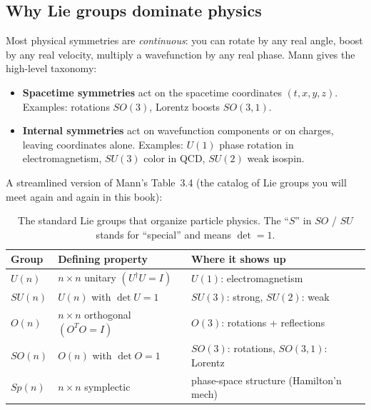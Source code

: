 \documentclass[11pt]{article}
\begin{document}
\subsection*{Why Lie groups dominate physics}

Most physical symmetries are \emph{continuous}: you can rotate by any
real angle, boost by any real velocity, multiply a wavefunction by any
real phase. Mann gives the high-level taxonomy:

\begin{itemize}[leftmargin=1.5em, itemsep=2pt]
  \item \textbf{Spacetime symmetries} act on the spacetime coordinates
    $(t, x, y, z)$. Examples: rotations $SO(3)$, Lorentz boosts $SO(3,1)$.
  \item \textbf{Internal symmetries} act on wavefunction components or
    on charges, leaving coordinates alone. Examples: $U(1)$ phase
    rotation in electromagnetism, $SU(3)$ color in QCD, $SU(2)$ weak
    isospin.
\end{itemize}

A streamlined version of Mann's Table~3.4 (the catalog of Lie groups you
will meet again and again in this book):

\begin{table}[H]
\centering
\renewcommand{\arraystretch}{1.2}
\begin{tabular}{@{}lll@{}}
\toprule
\textbf{Group} & \textbf{Defining property} & \textbf{Where it shows up} \\
\midrule
$U(n)$    & $n\times n$ unitary $(U^\dagger U = I)$
          & $U(1)$: electromagnetism \\
$SU(n)$   & $U(n)$ with $\det U = 1$
          & $SU(3)$: strong, $SU(2)$: weak \\
$O(n)$    & $n\times n$ orthogonal $(O^TO = I)$
          & $O(3)$: rotations + reflections \\
$SO(n)$   & $O(n)$ with $\det O = 1$
          & $SO(3)$: rotations, $SO(3,1)$: Lorentz \\
$Sp(n)$   & $n\times n$ symplectic
          & phase-space structure (Hamilton'n mech) \\
\bottomrule
\end{tabular}
\caption{The standard Lie groups that organize particle physics. The
``$S$'' in $SO$ / $SU$ stands for ``special'' and means $\det = 1$.}
\end{table}
\end{document}
